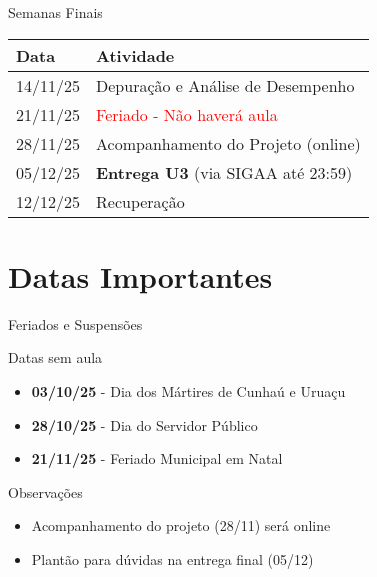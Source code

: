 \documentclass[10pt, aspectratio=169]{beamer}
\begin{document}
\begin{frame}{Semanas Finais}
\begin{table}
\scriptsize
\centering
\begin{tabular}{ll}
\toprule
\textbf{Data} & \textbf{Atividade} \\
\midrule
14/11/25 & Depuração e Análise de Desempenho \\
21/11/25 & \textcolor{red}{Feriado - Não haverá aula} \\
28/11/25 & Acompanhamento do Projeto (online) \\
05/12/25 & \textbf{Entrega U3} (via SIGAA até 23:59) \\
12/12/25 & Recuperação \\
\bottomrule
\end{tabular}
\end{table}
\end{frame}

\section{Datas Importantes}
\begin{frame}{Feriados e Suspensões}
\begin{alertblock}{Datas sem aula}
\begin{itemize}
    \item \textbf{03/10/25} - Dia dos Mártires de Cunhaú e Uruaçu
    \item \textbf{28/10/25} - Dia do Servidor Público
    \item \textbf{21/11/25} - Feriado Municipal em Natal
\end{itemize}
\end{alertblock}

\begin{block}{Observações}
\begin{itemize}
    \item Acompanhamento do projeto (28/11) será online
    \item Plantão para dúvidas na entrega final (05/12)
\end{itemize}
\end{block}
\end{frame}
\end{document}
